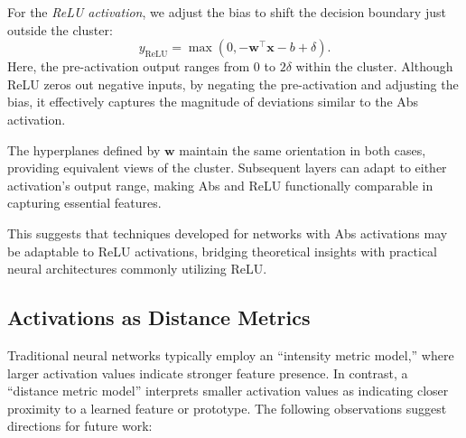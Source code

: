 For the \emph{ReLU activation}, we adjust the bias to shift the decision boundary just outside the cluster:
\begin{equation}
\label{eq:relu_activation_compact}
y_{\text{ReLU}} = \max\left( 0, -\mathbf{w}^\top \mathbf{x} - b + \delta \right).
\end{equation}
Here, the pre-activation output ranges from \(0\) to \(2\delta\) within the cluster. Although ReLU zeros out negative inputs, by negating the pre-activation and adjusting the bias, it effectively captures the magnitude of deviations similar to the Abs activation.

The hyperplanes defined by \(\mathbf{w}\) maintain the same orientation in both cases, providing equivalent views of the cluster. Subsequent layers can adapt to either activation's output range, making Abs and ReLU functionally comparable in capturing essential features.

This suggests that techniques developed for networks with Abs activations may be adaptable to ReLU activations, bridging theoretical insights with practical neural architectures commonly utilizing ReLU.

\subsection{Activations as Distance Metrics}

Traditional neural networks typically employ an ``intensity metric model,'' where larger activation values indicate stronger feature presence. In contrast, a ``distance metric model'' interprets smaller activation values as indicating closer proximity to a learned feature or prototype. The following observations suggest directions for future work:

